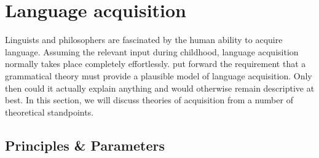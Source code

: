 \chapter{Language acquisition}
\label{chap-acquisition}

Linguists and philosophers are fascinated by the human ability to acquire language. Assuming the relevant input during childhood,
language acquisition normally takes place completely effortlessly.
\citet[--25]{Chomsky65a} put forward the requirement that a grammatical theory must provide a plausible model of language acquisition.
Only then could it actually explain anything and would otherwise remain descriptive at best. In this section, we will discuss
theories of acquisition from a number of theoretical standpoints.


\section{Principles \& Parameters}
\label{Abschnitt-PP}\label{sec-pro-drop}

